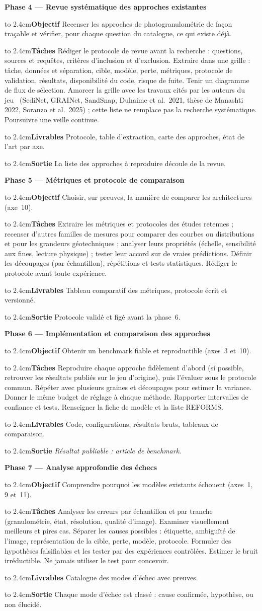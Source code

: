 \documentclass[11pt,a4paper]{article}
\newcommand{\phase}[2]{\par\bigskip\noindent\textbf{Phase #1 --- #2}\par\nopagebreak\smallskip}
\newcommand{\champ}[1]{\par\noindent\hangindent=2.4cm\hangafter=1\hbox to 2.4cm{\textbf{#1}\hfil}\ignorespaces}
\begin{document}
\phase{4}{Revue systématique des approches existantes}
\champ{Objectif} Recenser les approches de photogranulométrie de façon traçable et vérifier, pour chaque question du catalogue, ce qui existe déjà.
\champ{Tâches} Rédiger le protocole de revue avant la recherche : questions, sources et requêtes, critères d'inclusion et d'exclusion. Extraire dans une grille : tâche, données et séparation, cible, modèle, perte, métriques, protocole de validation, résultats, disponibilité du code, risque de fuite. Tenir un diagramme de flux de sélection. Amorcer la grille avec les travaux cités par les auteurs du jeu~\cite{plante} (SediNet, GRAINet, SandSnap, Duhaime et al.\ 2021, thèse de Manashti 2022, Soranzo et al.\ 2025) ; cette liste ne remplace pas la recherche systématique. Poursuivre une veille continue.
\champ{Livrables} Protocole, table d'extraction, carte des approches, état de l'art par axe.
\champ{Sortie} La liste des approches à reproduire découle de la revue.

\phase{5}{Métriques et protocole de comparaison}
\champ{Objectif} Choisir, sur preuves, la manière de comparer les architectures (axe~10).
\champ{Tâches} Extraire les métriques et protocoles des études retenues ; recenser d'autres familles de mesures pour comparer des courbes ou distributions et pour les grandeurs géotechniques ; analyser leurs propriétés (échelle, sensibilité aux fines, lecture physique) ; tester leur accord sur de vraies prédictions. Définir les découpages (par échantillon), répétitions et tests statistiques. Rédiger le protocole avant toute expérience.
\champ{Livrables} Tableau comparatif des métriques, protocole écrit et versionné.
\champ{Sortie} Protocole validé et figé avant la phase~6.

\phase{6}{Implémentation et comparaison des approches}
\champ{Objectif} Obtenir un benchmark fiable et reproductible (axes~3 et~10).
\champ{Tâches} Reproduire chaque approche fidèlement d'abord (si possible, retrouver les résultats publiés sur le jeu d'origine), puis l'évaluer sous le protocole commun. Répéter avec plusieurs graines et découpages pour estimer la variance. Donner le même budget de réglage à chaque méthode. Rapporter intervalles de confiance et tests. Renseigner la fiche de modèle et la liste REFORMS.
\champ{Livrables} Code, configurations, résultats bruts, tableaux de comparaison.
\champ{Sortie} \emph{Résultat publiable : article de benchmark.}

\phase{7}{Analyse approfondie des échecs}
\champ{Objectif} Comprendre pourquoi les modèles existants échouent (axes~1, 9 et~11).
\champ{Tâches} Analyser les erreurs par échantillon et par tranche (granulométrie, état, résolution, qualité d'image). Examiner visuellement meilleurs et pires cas. Séparer les causes possibles : étiquette, ambiguïté de l'image, représentation de la cible, perte, modèle, protocole. Formuler des hypothèses falsifiables et les tester par des expériences contrôlées. Estimer le bruit irréductible. Ne jamais utiliser le test pour concevoir.
\champ{Livrables} Catalogue des modes d'échec avec preuves.
\champ{Sortie} Chaque mode d'échec est classé : cause confirmée, hypothèse, ou non élucidé.
\end{document}

